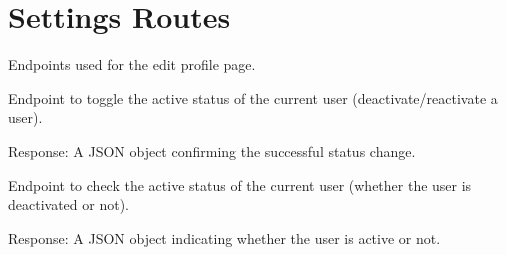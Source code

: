 \documentclass[letterpaper,10pt,english]{sphinxmanual}
\begin{document}
\sphinxstepscope


\chapter{Settings Routes}
\label{\detokenize{routes.settings:module-routes.settings.routes}}\label{\detokenize{routes.settings:settings-routes}}\label{\detokenize{routes.settings::doc}}
\sphinxAtStartPar
Endpoints used for the edit profile page.

\begin{fulllineitems}
\label{\detokenize{routes.settings:routes.settings.routes.change_active_status}}
\pysigstartsignatures
{}
\pysigstopsignatures
\sphinxAtStartPar
Endpoint to toggle the active status of the current user (deactivate/reactivate a user).
\begin{description}
\sphinxAtStartPar
Response: A JSON object confirming the successful status change.

\end{description}

\end{fulllineitems}


\begin{fulllineitems}
\label{\detokenize{routes.settings:routes.settings.routes.check_active_status}}
\pysigstartsignatures
{}
\pysigstopsignatures
\sphinxAtStartPar
Endpoint to check the active status of the current user (whether the user is deactivated or not).
\begin{description}
\sphinxAtStartPar
Response: A JSON object indicating whether the user is active or not.

\end{description}

\end{fulllineitems}
\end{document}
